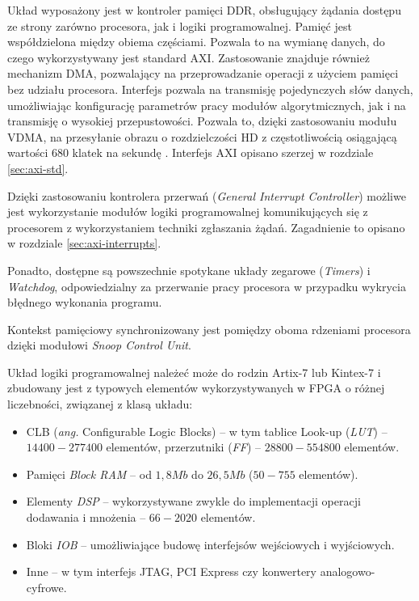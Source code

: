 Układ wyposażony jest w kontroler pamięci DDR, obsługujący żądania dostępu ze strony zarówno procesora, jak i logiki programowalnej. %
Pamięć jest współdzielona między obiema częściami. %
Pozwala to na wymianę danych, do czego wykorzystywany jest standard AXI. Zastosowanie znajduje również mechanizm DMA, pozwalający na przeprowadzanie operacji z użyciem pamięci bez udziału procesora. 
Interfejs pozwala na transmisję pojedynczych słów danych, umożliwiając konfigurację parametrów pracy modułów algorytmicznych, jak i na transmisję o wysokiej przepustowości. 
Pozwala to, dzięki zastosowaniu modułu VDMA, na przesyłanie obrazu o rozdzielczości HD z częstotliwością osiągającą wartości 680 klatek na sekundę \cite{axi-vdma-guide}. 
Interfejs AXI opisano szerzej w rozdziale \ref{sec:axi-std}.

Dzięki zastosowaniu kontrolera przerwań (\emph{General Interrupt Controller}) możliwe jest wykorzystanie modułów logiki programowalnej komunikujących się z procesorem z wykorzystaniem techniki zgłaszania żądań. Zagadnienie to opisano w rozdziale \ref{sec:axi-interrupts}.

Ponadto, dostępne są powszechnie spotykane układy zegarowe (\emph{Timers}) i \emph{Watchdog}, odpowiedzialny za przerwanie pracy procesora w przypadku wykrycia błędnego wykonania programu.

Kontekst pamięciowy synchronizowany jest pomiędzy oboma rdzeniami procesora dzięki modułowi \emph{Snoop Control Unit}.

Układ logiki programowalnej należeć może do rodzin Artix-7 lub Kintex-7 i zbudowany jest z typowych elementów wykorzystywanych w FPGA o różnej liczebności, związanej z klasą układu:
\begin{itemize}
	\item CLB (\emph{ang.} Configurable Logic Blocks) -- w tym tablice Look-up (\emph{LUT}) -- $14400 - 277400$ elementów, przerzutniki (\emph{FF}) -- $28800 - 554800$ elementów.
	
	\item Pamięci \emph{Block RAM} -- od $1,8Mb$ do $26,5Mb$ ($50 - 755$ elementów).
	
	\item Elementy \emph{DSP} -- wykorzystywane zwykle do implementacji operacji dodawania i mnożenia -- $66 - 2020$ elementów.
	
	\item Bloki \emph{IOB} -- umożliwiające budowę interfejsów wejściowych i wyjściowych.
	
	\item Inne -- w tym interfejs JTAG, PCI Express czy konwertery analogowo-cyfrowe.
\end{itemize}

